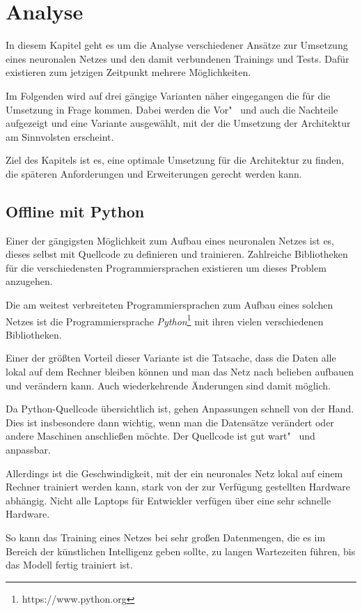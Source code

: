 \section{Analyse}
\label{sec:analyse}
In diesem Kapitel geht es um die Analyse verschiedener Ansätze zur Umsetzung eines neuronalen Netzes und den damit
verbundenen Trainings und Tests. Dafür existieren zum jetzigen Zeitpunkt mehrere Möglichkeiten.

Im Folgenden wird auf drei gängige Varianten näher eingegangen die für die Umsetzung in Frage kommen. Dabei werden die
Vor"~ und auch die Nachteile aufgezeigt und eine Variante ausgewählt, mit der die Umsetzung der Architektur am
Sinnvolsten erscheint.

Ziel des Kapitels ist es, eine optimale Umsetzung für die Architektur zu finden, die späteren Anforderungen und
Erweiterungen gerecht werden kann.

\subsection{Offline mit Python}
Einer der gängigsten Möglichkeit zum Aufbau eines neuronalen Netzes ist es, dieses selbst mit Quellcode zu definieren
und trainieren. Zahlreiche Bibliotheken für die verschiedensten Programmiersprachen existieren um dieses Problem
anzugehen.

Die am weitest verbreiteten Programmiersprachen zum Aufbau eines solchen Netzes ist die Programmiersprache
\textit{Python}\footnote{https://www.python.org} mit ihren vielen verschiedenen Bibliotheken.

Einer der größten Vorteil dieser Variante ist die Tatsache, dass die Daten alle lokal auf dem Rechner bleiben können und
man das Netz nach belieben aufbauen und verändern kann. Auch wiederkehrende Änderungen sind damit möglich.

Da Python-Quellcode übersichtlich ist, gehen Anpassungen schnell von der Hand. Dies ist insbesondere dann wichtig, wenn
man die Datensätze verändert oder andere Maschinen anschließen möchte. Der Quellcode ist gut wart"~ und anpassbar.

Allerdings ist die Geschwindigkeit, mit der ein neuronales Netz lokal auf einem Rechner trainiert werden kann, stark
von der zur Verfügung gestellten Hardware abhängig. Nicht alle Laptops für Entwickler verfügen über eine sehr schnelle
Hardware.

So kann das Training eines Netzes bei sehr großen Datenmengen, die es im Bereich der künstlichen Intelligenz geben
sollte, zu langen Wartezeiten führen, bis das Modell fertig trainiert ist.

